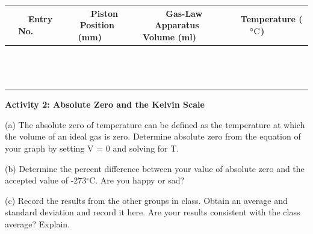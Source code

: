 \vspace{0.3cm}
{\centering \begin{tabular}{|c|c|c|c|}
\hline 
~~~Entry No.~~~&
~~~Piston Position (mm)~~~&
~~~Gas-Law Apparatus Volume (ml)~~~&
~~~Temperature ($^\circ  \rm C$)~~~\\
\hline
\hline 
&
&
&
\\
\hline 
&
&
&
\\
\hline 
&
&
&
\\
\hline 
&
&
&
\\
\hline 
&
&
&
\\
\hline 
&
&
&
\\
\hline 
&
&
&
\\
\hline 
&
&
&
\\
\hline 
&
&
&
\\
\hline
&
&
&
\\
\hline
&
&
&
\\
\hline
&
&
&
\\
\hline
&
&
&
\\
\hline
&
&
&
\\
\hline
\end{tabular}\par}
\vspace{1.0cm}

\textbf{Activity 2: Absolute Zero and the Kelvin Scale}

(a) The absolute zero of temperature can be defined as the temperature
at which the volume of an ideal gas is zero. Determine absolute
zero from the equation of your graph by setting V = 0 and solving for T.
\answerspace{30mm}

(b) Determine the percent difference between your value of absolute
zero and the accepted value of -273\( ^{\circ } \)C. Are you happy or sad?
\answerspace{30mm}

(c) Record the results from the other groups in class.
Obtain an average and standard deviation and record it here.
Are your results consistent with the class average? Explain.
\answerspace{10mm}
